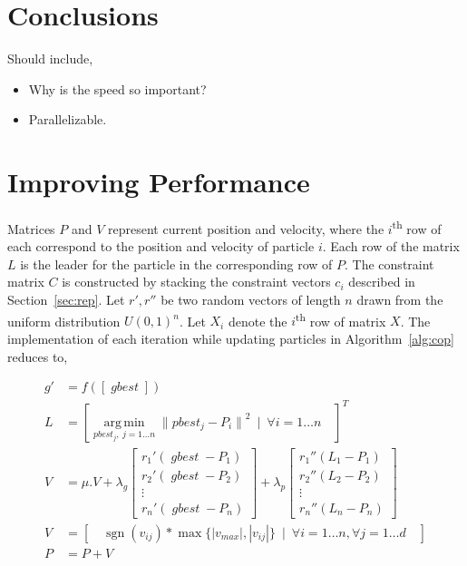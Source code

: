 \documentclass[9pt]{article}
\newenvironment{pointers}{%
  \noindent Should include,
  \begin{itemize}
    \setlength{\itemsep}{-1pt}}{%
\end{itemize}}
\DeclareMathOperator*{\argmin}{arg\,min}
\DeclareMathOperator*{\sgn}{sgn}
\DeclareMathOperator*{\gbest}{\mathit{gbest}}
\begin{document}
\section{Conclusions}
\begin{pointers}
\item Why is the speed so important?
\item Parallelizable.
\end{pointers}


\appendix


\section{Improving Performance}\label{app:imp}

Matrices $P$ and $V$ represent current position and velocity, where the $i$\textsuperscript{th} row of each correspond
to the position and velocity of particle $i$. Each row of the matrix $L$ is the leader for the particle in the
corresponding row of $P$. The constraint matrix $C$ is constructed by stacking the constraint vectors $c_i$ described in
Section~\ref{sec:rep}. Let $r',r''$ be two random vectors of length $n$ drawn from the uniform distribution
${U(0,1)}^n$. Let $X_i$ denote the $i$\textsuperscript{th} row of matrix $X$. The implementation of each iteration while
updating particles in Algorithm~\ref{alg:cop} reduces to,

\begin{align*}
  g' &= f([\gbest])\\
  L  &= {[\argmin\limits_{pbest_j,\ j = 1\dots n} {\|pbest_j - P_i\|}^2\ \mid\ \forall i = 1\dots n\quad ]}^T\\
  V  &= \mu.V + \lambda_g\begin{bmatrix}
    {r_1}'(\gbest - P_1)\\
    {r_2}'(\gbest - P_2)\\
    \vdots\\
    {r_n}'(\gbest - P_n)
  \end{bmatrix} + \lambda_p\begin{bmatrix}
    {r_1}''(L_1 - P_1)\\
    {r_2}''(L_2 - P_2)\\
    \vdots\\
    {r_n}''(L_n - P_n)
  \end{bmatrix}\\
  V  &= [\quad\sgn(v_{ij})*\max\{|v_{max}|,|v_{ij}|\}\ \mid\ \forall i=1\dots n,\forall j=1\dots d\quad]\\
  P  &= P + V\\
\end{align*}
\end{document}
